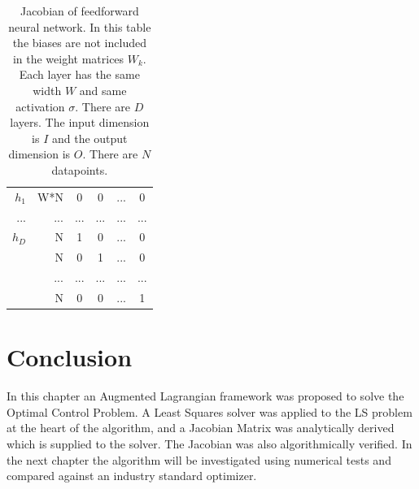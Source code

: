 \begin{table}
\begin{subtable}{\textwidth}
{\begin{tabular}{ r r | c c c c }
$h_1$ & W*N & 0 & 0 &...& 0 \\
...   & ... &...&...&...&...\\\hline
$h_D$ & N & 1 & 0 &...& 0 \\
      & N & 0 & 1 &...& 0  \\
      &...&...&...&...&...\\ 
      & N & 0 & 0 &...& 1  \\ \hline
\end{tabular}}
\end{subtable}
\caption{Jacobian of feedforward neural network. In this table the biases are not included in the weight matrices $W_k$. Each layer has the same width $W$ and same activation $\sigma$. There are $D$ layers. The input dimension is $I$ and the output dimension is $O$. There are $N$ datapoints.}
\label{jac-tab}

\end{table}
\FloatBarrier
\section{Conclusion}
In this chapter an Augmented Lagrangian framework was proposed to solve the Optimal Control Problem. A Least Squares solver was applied to the LS problem at the heart of the algorithm, and a Jacobian Matrix was analytically derived which is supplied to the solver. The Jacobian was also algorithmically verified. In the next chapter the algorithm will be investigated using numerical tests and compared against an industry standard optimizer.



